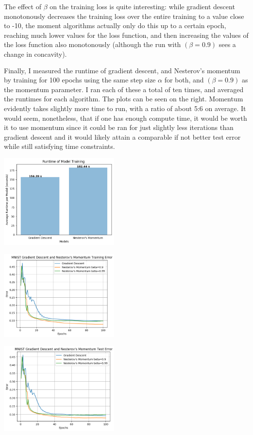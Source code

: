 \documentclass[10pt]{article}
\begin{document}
\begin{multicols}{2}
The effect of $\beta$ on the training loss is quite interesting: while gradient descent monotonously decreases the training loss over the entire training to a value close to -10, the moment algorithms actually only do this up to a certain epoch, reaching much lower values for the loss function, and then increasing the values of the loss function also monotonously (although the run with $(\beta=0.9)$ sees a change in concavity). \par 
Finally, I measured the runtime of gradient descent, and Nesterov's momentum by training for 100 epochs using the same step size $\alpha$ for both, and $(\beta=0.9)$ as the momentum parameter. I ran each of these a total of ten times, and averaged the runtimes for each algorithm. The plots can be seen on the right. Momentum evidently takes slightly more time to run, with a ratio of about 5:6 on average. It would seem, nonetheless, that if one has enough compute time, it would be worth it to use momentum since it could be ran for just slightly less iterations than gradient descent and it would likely attain a comparable if not better test error while still satisfying time constraints.\par
\begin{center}
    \includegraphics[width=0.45\textwidth]{train_time_part1.png}
\end{center}
\begin{center}
    \includegraphics[width=0.45\textwidth]{GradientDescentandNesterov'sMomentumTrainingError.png}
\end{center}
\begin{center}
    \includegraphics[width=0.45\textwidth]{GradientDescentandNesterov'sMomentumTestError.png}

\end{center}
\end{multicols}
\end{document}
